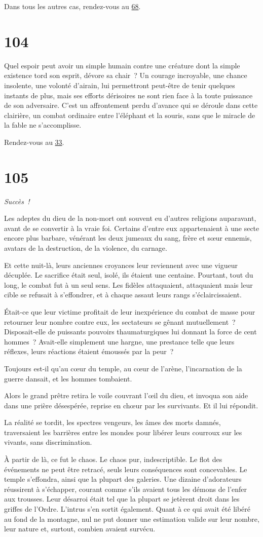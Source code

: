 \documentclass{report}
\newcommand{\gsection}[1]{
    \section{#1}
    \label{section-#1}
}
\newcommand{\glink}[1]{\hyperref[section-#1]{#1}}
\newcommand{\success}{\emph{Succès !}}
\begin{document}
Dans tous les autres cas, rendez-vous au \glink{68}.

\gsection{104}

Quel espoir peut avoir un simple humain contre une créature dont la simple existence tord son esprit, dévore sa chair ? Un courage incroyable, une chance insolente, une volonté d'airain, lui permettront peut-être de tenir quelques instants de plus, mais ses efforts dérisoires ne sont rien face à la toute puissance de son adversaire. C'est un affrontement perdu d'avance qui se déroule dans cette clairière, un combat ordinaire entre l'éléphant et la souris, sans que le miracle de la fable ne s'accomplisse.

Rendez-vous au \glink{33}.

\gsection{105}

\success

Les adeptes du dieu de la non-mort ont souvent eu d'autres religions auparavant, avant de se convertir à la vraie foi. Certains d'entre eux appartenaient à une secte encore plus barbare, vénérant les deux jumeaux du sang, frère et sœur ennemis, avatars de la destruction, de la violence, du carnage.

Et cette nuit-là, leurs anciennes croyances leur reviennent avec une vigueur décuplée. Le sacrifice était seul, isolé, ils étaient une centaine. Pourtant, tout du long, le combat fut à un seul sens. Les fidèles attaquaient, attaquaient mais leur cible se refusait à s'effondrer, et à chaque assaut leurs rangs s'éclaircissaient.

Était-ce que leur victime profitait de leur inexpérience du combat de masse pour retourner leur nombre contre eux, les sectateurs se gênant mutuellement ? Disposait-elle de puissants pouvoirs thaumaturgiques lui donnant la force de cent hommes ? Avait-elle simplement une hargne, une prestance telle que leurs réflexes, leurs réactions étaient émoussés par la peur ?

Toujours est-il qu'au cœur du temple, au cœur de l'arène, l'incarnation de la guerre dansait, et les hommes tombaient.

Alors le grand prêtre retira le voile couvrant l’œil du dieu, et invoqua son aide dans une prière désespérée, reprise en chœur par les survivants. Et il lui répondit.

La réalité se tordit, les spectres vengeurs, les âmes des morts damnés, traversaient les barrières entre les mondes pour libérer leurs courroux sur les vivants, sans discrimination.

À partir de là, ce fut le chaos. Le chaos pur, indescriptible. Le flot des événements ne peut être retracé, seuls leurs conséquences sont concevables. Le temple s'effondra, ainsi que la plupart des galeries. Une dizaine d'adorateurs réussirent à s'échapper, courant comme s'ils avaient tous les démons de l'enfer aux trousses. Leur désarroi était tel que la plupart se jetèrent droit dans les griffes de l'Ordre. L'intrus s'en sortit également. Quant à ce qui avait été libéré au fond de la montagne, nul ne put donner une estimation valide sur leur nombre, leur nature et, surtout, combien avaient survécu.
\end{document}
